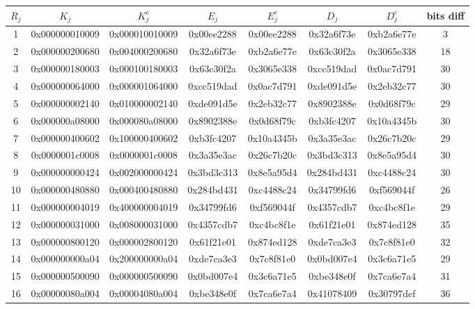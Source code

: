 \documentclass[12pt,letterpaper]{article}
\begin{document}
\begin{footnotesize}
\begin{center}
\begin{tabular}{||c|c|c|c|c|c|c|c||} 
 \hline
    $R_j$ & $K_j$ & $K_j^c$ & $E_j$ & $E_j^c$ & $D_j$ & $D_j^c$ & bits diff \\ 
 \hline
    1 & 0x000000010009 & 0x000010010009 & 0x00ee2288 & 0x00ee2288 & 0x32a6f73e & 0xb2a6e77e & 3\\
 \hline
    2 & 0x000000200680 & 0x004000200680 & 0x32a6f73e & 0xb2a6e77e & 0x63c30f2a & 0x3065e338 & 18\\
 \hline
    3 & 0x000000180003 & 0x000100180003 & 0x63c30f2a & 0x3065e338 & 0xcc519dad & 0x0ac7d791 & 30\\
 \hline
    4 & 0x000000064000 & 0x000001064000 & 0xcc519dad & 0x0ac7d791 & 0xde091d5e & 0x2eb32c77 & 30\\
 \hline
    5 & 0x000000002140 & 0x010000002140 & 0xde091d5e & 0x2eb32c77 & 0x8902388e & 0x0d68f79c & 29\\
 \hline
    6 & 0x000000a08000 & 0x000080a08000 & 0x8902388e & 0x0d68f79c & 0xb3fc4207 & 0x10a4345b & 30\\
 \hline
    7 & 0x000000400602 & 0x100000400602 & 0xb3fc4207 & 0x10a4345b & 0x3a35e3ac & 0x26c7b20c & 29\\
 \hline
    8 & 0x0000001c0008 & 0x0000001c0008 & 0x3a35e3ac & 0x26c7b20c & 0x3bd3c313 & 0x8e5a95d4 & 30\\
 \hline
    9 & 0x000000000424 & 0x002000000424 & 0x3bd3c313 & 0x8e5a95d4 & 0x284bd431 & 0xc4488c24 & 30\\
 \hline
    10 & 0x000000480880 & 0x000400480880 & 0x284bd431 & 0xc4488c24 & 0x34799fd6 & 0xf569044f & 26\\
 \hline
    11 & 0x000000004019 & 0x400000004019 & 0x34799fd6 & 0xf569044f & 0x4357cdb7 & 0xc4bc8f1e & 29\\
 \hline
    12 & 0x000000031000 & 0x008000031000 & 0x4357cdb7 & 0xc4bc8f1e & 0x61f21e01 & 0x874ed128 & 35\\
 \hline
    13 & 0x000000800120 & 0x000002800120 & 0x61f21e01 & 0x874ed128 & 0xde7ca3e3 & 0x7c8f81e0 & 32\\
 \hline
    14 & 0x000000000a04 & 0x200000000a04 & 0xde7ca3e3 & 0x7c8f81e0 & 0x0bd007e4 & 0x3c6a71e5 & 29\\
 \hline
    15 & 0x000000500090 & 0x000000500090 & 0x0bd007e4 & 0x3c6a71e5 & 0xbe348e0f & 0x7ca6e7a4 & 31\\
 \hline
    16 & 0x00000080a004 & 0x00004080a004 & 0xbe348e0f & 0x7ca6e7a4 & 0x41078409 & 0x30797def & 36\\
\hline
\end{tabular}
\end{center}
\end{footnotesize}
\end{document}
